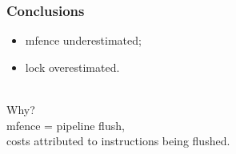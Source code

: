 \begin{frame}
  \frametitle{Conclusions}

  
    \begin{itemize}
    \item mfence underestimated;
      \item lock overestimated.
    \end{itemize}
    ~\\
    Why? \\[1em]
    mfence = pipeline flush,\\
    costs attributed to instructions being flushed.\\
  

\end{frame}



